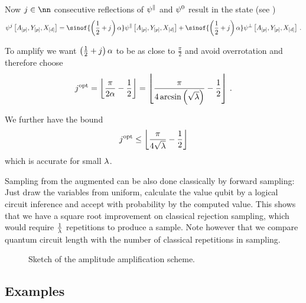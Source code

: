 Now $\repnum\in\nn$ consecutive reflections of $\psi^{\parallel}$ and $\psi^{0}$ result in the state (see )
\begin{align*}
    \qstateofat{\repnum}{\avariables,\headvariables,\shortcatvariables}
    = \sinof{\left(\frac{1}{2}+\repnum\right)\rotanglesymbol} \qstateofat{\goodstatesymbol}{\avariables,\headvariables,\shortcatvariables}
    + \sinof{\left(\frac{1}{2}+\repnum\right)\rotanglesymbol} \qstateofat{\badstatesymbol}{\avariables,\headvariables,\shortcatvariables} \, .
\end{align*}

To amplify we want $\left(\frac{1}{2}+j\right)\alpha$ to be as close to $\frac{\pi}{2}$ and avoid overrotation and therefore choose
\begin{align*}
    j^{\mathrm{opt}}
    = \left\lfloor \frac{\pi}{2 \alpha} -\frac{1}{2}  \right\rfloor
    = \left\lfloor \frac{\pi}{4 \arcsin\left(\sqrt{\lambda}\right)} -\frac{1}{2}  \right\rfloor  \, .
\end{align*}

We further have the bound
\begin{align*}
   j^{\mathrm{opt}}
   \leq \left\lfloor \frac{\pi}{4 \sqrt{\lambda}} -\frac{1}{2}  \right\rfloor
\end{align*}
which is accurate for small $\lambda$.

Sampling from the augmented \ComputationActivationNetwork{} can be also done classically by forward sampling:
Just draw the variables from uniform, calculate the value qubit by a logical circuit inference and accept with probability by the computed value.
This shows that we have a square root improvement on classical rejection sampling, which would require $\frac{1}{\lambda}$ repetitions to produce a sample.
Note however that we compare quantum circuit length with the number of classical repetitions in sampling.

\begin{figure}[t]
    \begin{center}
        
    \end{center}
    \caption{Sketch of the amplitude amplification scheme.}
    \label{fig:rotationSketch}
\end{figure}

\subsection{Examples}


